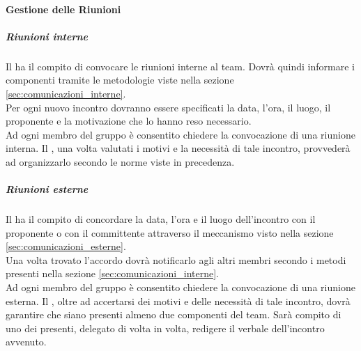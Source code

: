			\paragraph{Gestione delle Riunioni}
				\subparagraph{Riunioni interne}
				Il \roleProjectManager{} ha il compito di convocare le riunioni interne al team. Dovrà quindi informare i componenti tramite le metodologie viste nella sezione \ref{sec:comunicazioni_interne}.\\
				Per ogni nuovo incontro dovranno essere specificati la data, l’ora, il luogo, il proponente\gloss{} e la motivazione che lo hanno reso necessario. \\
				Ad ogni membro del gruppo è consentito chiedere la convocazione di una riunione interna. Il \roleProjectManager{}, una volta valutati i motivi e la necessità di tale incontro, provvederà ad organizzarlo secondo le norme viste in precedenza.
				\subparagraph{Riunioni esterne} \label{sec:riunioni_esterne}
				Il \roleProjectManager{} ha il compito di concordare la data, l’ora e il luogo dell'incontro con il proponente o con il committente attraverso 	il meccanismo visto nella sezione \ref{sec:comunicazioni_esterne}. \\
				Una volta trovato l'accordo dovrà notificarlo agli altri membri secondo i metodi presenti nella sezione \ref{sec:comunicazioni_interne}. \\
				Ad ogni membro del gruppo è consentito chiedere la convocazione di una riunione esterna. Il \roleProjectManager, oltre ad accertarsi dei motivi e delle necessità di tale incontro, dovrà garantire che siano presenti almeno due componenti del team. Sarà compito di uno dei presenti, delegato di volta in volta, redigere il verbale dell’incontro avvenuto.
			
